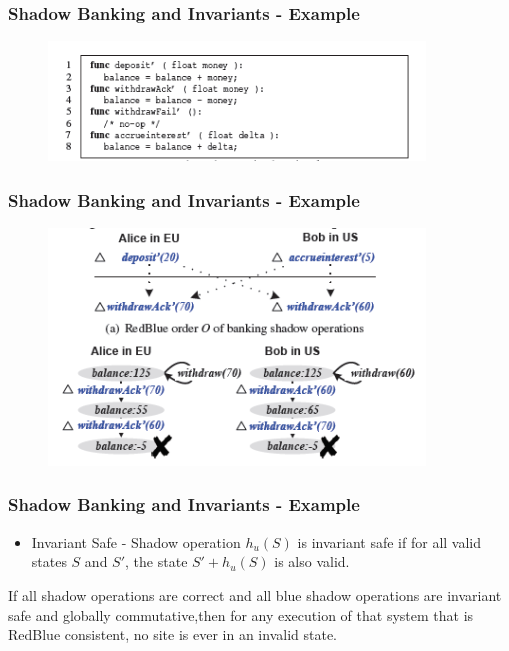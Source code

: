 \documentclass{beamer}
\begin{document}

\begin{frame}
\frametitle{Shadow Banking and Invariants - Example}
\begin{figure}[t]
\includegraphics[width=10cm]{pic6.jpg}
\centering
\end{figure}

\end{frame}


\begin{frame}
\frametitle{Shadow Banking and Invariants - Example}
\begin{figure}[t]
\includegraphics[width=10cm]{pic7.jpg}
\centering
\end{figure}

\end{frame}


\begin{frame}
\frametitle{Shadow Banking and Invariants - Example}
\begin{itemize}
\item Invariant Safe - Shadow operation $h_u(S)$ is invariant safe if for all valid states $S$ and $S'$, the state $S' + h_u(S)$ is also valid.
\end{itemize}
\begin{theorem}
If all shadow operations are correct and all blue shadow operations are invariant safe and globally commutative,then for any execution of that system that is RedBlue consistent, no site is ever in an invalid state.
\end{theorem}
\end{frame}
\end{document}
